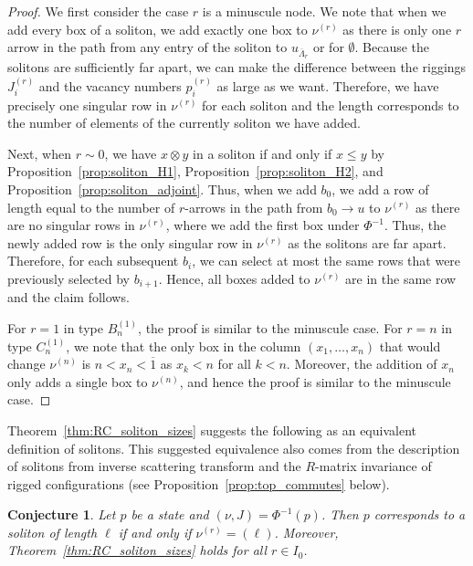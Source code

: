 \documentclass[reqno]{amsart}
\newcommand{\clfw}{\overline{\Lambda}} %
\newcommand{\bon}{\overline{1}}
\theoremstyle{plain}
\newtheorem{conj}[thm]{Conjecture}
\theoremstyle{definition}
\numberwithin{equation}{section}
\begin{document}
\begin{proof}
We first consider the case $r$ is a minuscule node.
We note that when we add every box of a soliton, we add exactly one box to $\nu^{(r)}$ as there is only one $r$ arrow in the path from any entry of the soliton to $u_{\clfw_r}$ or for $\emptyset$.
Because the solitons are sufficiently far apart, we can make the difference between the riggings $J_i^{(r)}$ and the vacancy numbers $p_i^{(r)}$ as large as we want.
Therefore, we have precisely one singular row in $\nu^{(r)}$ for each soliton and the length corresponds to the number of elements of the currently soliton we have added.

Next, when $r \sim 0$, we have $x \otimes y$ in a soliton if and only if $x \leq y$ by Proposition~\ref{prop:soliton_H1}, Proposition~\ref{prop:soliton_H2}, and Proposition~\ref{prop:soliton_adjoint}.
Thus, when we add $b_0$, we add a row of length equal to the number of $r$-arrows in the path from $b_0 \to u$ to $\nu^{(r)}$ as there are no singular rows in $\nu^{(r)}$, where we add the first box under $\Phi^{-1}$.
Thus, the newly added row is the only singular row in $\nu^{(r)}$ as the solitons are far apart.
Therefore, for each subsequent $b_i$, we can select at most the same rows that were previously selected by $b_{i+1}$.
Hence, all boxes added to $\nu^{(r)}$ are in the same row and the claim follows.

For $r = 1$ in type $B_n^{(1)}$, the proof is similar to the minuscule case.
For $r = n$ in type $C_n^{(1)}$, we note that the only box in the column $(x_1, \dotsc, x_n)$ that would change $\nu^{(n)}$ is $n < x_n < \bon$ as $x_k < n$ for all $k < n$.
Moreover, the addition of $x_n$ only adds a single box to $\nu^{(n)}$, and hence the proof is similar to the minuscule case.
\end{proof}

Theorem~\ref{thm:RC_soliton_sizes} suggests the following as an equivalent definition of solitons.
This suggested equivalence also comes from the description of solitons from inverse scattering transform and the $R$-matrix invariance of rigged configurations (see Proposition~\ref{prop:top_commutes} below).

\begin{conj}
\label{conj:soliton_partition}
Let $p$ be a state and $(\nu, J) = \Phi^{-1}(p)$.
Then $p$ corresponds to a soliton of length $\ell$ if and only if $\nu^{(r)} = (\ell)$.
Moreover, Theorem~\ref{thm:RC_soliton_sizes} holds for all $r \in I_0$.
\end{conj}
\end{document}
